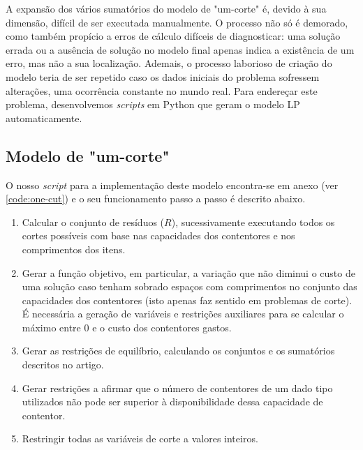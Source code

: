 \documentclass[12pt, a4paper, titlepage]{article}
\begin{document}
A expansão dos vários sumatórios do modelo de "um-corte"{} é, devido à sua dimensão, difícil de ser
executada manualmente. O processo não só é demorado, como também propício a erros de cálculo
difíceis de diagnosticar: uma solução errada ou a ausência de solução no modelo final apenas indica
a existência de um erro, mas não a sua localização. Ademais, o processo laborioso de criação do
modelo teria de ser repetido caso os dados iniciais do problema sofressem alterações, uma ocorrência
constante no mundo real. Para endereçar este problema, desenvolvemos \emph{scripts} em Python que
geram o modelo LP automaticamente.

\subsection{Modelo de "um-corte"{}}

O nosso \emph{script} para a implementação deste modelo encontra-se em anexo (ver
\ref{code:one-cut}) e o seu funcionamento passo a passo é descrito abaixo.


\begin{enumerate}
    \item Calcular o conjunto de resíduos ($R$), sucessivamente executando todos os cortes possíveis
        com base nas capacidades dos contentores e nos comprimentos dos itens.

    \item Gerar a função objetivo, em particular, a variação que não diminui o custo de uma solução
        caso tenham sobrado espaços com comprimentos no conjunto das capacidades dos contentores
        (isto apenas faz sentido em problemas de corte). É necessária a geração de variáveis e
        restrições auxiliares para se calcular o máximo entre $0$ e o custo dos contentores gastos.

    \item Gerar as restrições de equilíbrio, calculando os conjuntos e os sumatórios descritos no
        artigo.

    \item Gerar restrições a afirmar que o número de contentores de um dado tipo utilizados não pode
        ser superior à disponibilidade dessa capacidade de contentor.

    \item Restringir todas as variáveis de corte a valores inteiros.
\end{enumerate}
\end{document}

